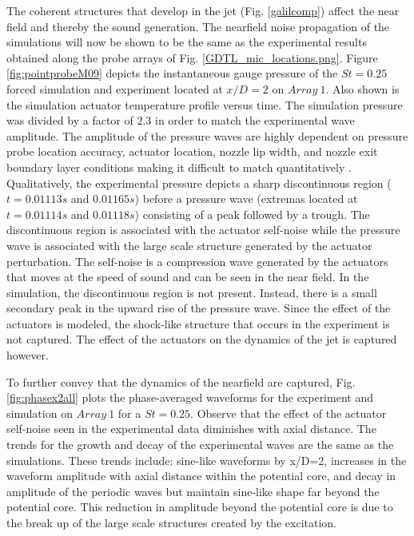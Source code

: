 \documentclass[english]{aiaa-tc}
\begin{document}
The coherent structures that develop in the jet (Fig. \ref{galilcomp}) affect the near field and thereby the sound generation.
The nearfield noise propagation of the simulations will now be shown to be the same as the experimental results obtained along the probe arrays of Fig. \ref{GDTL_mic_locations.png}.
Figure \ref{fig:pointprobeM09} depicts the instantaneous gauge pressure of the $St=0.25$ forced simulation and experiment located at $x/D=2$ on $Array~1$. Also shown is the simulation actuator temperature profile versus time. The simulation pressure was divided by a factor of $2.3$ in order to match the experimental wave amplitude. The amplitude of the pressure waves are highly dependent on pressure probe location accuracy, actuator location, nozzle lip width, and nozzle exit boundary layer conditions making it difficult to match quantitatively \cite{sinha2013}. Qualitatively, the experimental pressure depicts a sharp discontinuous region ($t=0.01113s$ and $0.01165s$)  before a pressure wave (extremas located at $t=0.01114s$ and $0.01118s$) consisting of a peak followed by a trough. The discontinuous region is associated with the actuator self-noise while the pressure wave is associated with the large scale structure generated by the actuator perturbation. The self-noise is a compression wave generated by the actuators that moves at the speed of sound and can be seen in the near field. In the simulation, the discontinuous region is not present. Instead, there is a small secondary peak in the upward rise of the pressure wave. Since the effect of the actuators is modeled, the shock-like structure that occurs in the experiment is not captured. The effect of the actuators on the dynamics of the jet is captured however.

To further convey that the dynamics of the nearfield are captured, Fig. \ref{fig:phasex2all} plots the phase-averaged waveforms for the experiment and simulation on $Array~1$ for a $St=0.25$.
Observe that the effect of the actuator self-noise seen in the experimental data diminishes with axial distance.
The trends for the growth and decay of the experimental waves are the same as the simulations. These trends include: sine-like waveforms by x/D=2, increases in the waveform amplitude with axial distance within the potential core, and decay in amplitude of the periodic waves but maintain sine-like shape far beyond the potential core.
This reduction in amplitude beyond the potential core is due to the break up of the large scale structures created by the excitation.
\end{document}
